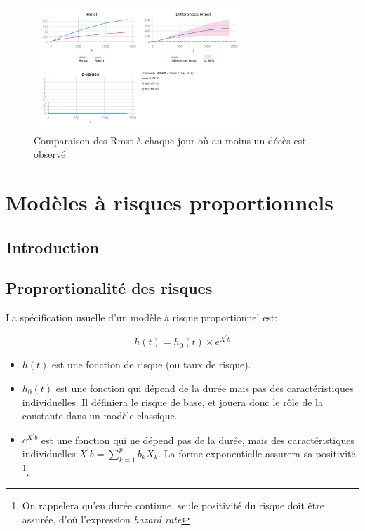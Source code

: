 \documentclass[
  12pt,
  letterpaper,
  DIV=11,
  numbers=noendperiod,
  onepage,
  openany]{scrreprt}
\begin{document}
\begin{figure}

\caption{Comparaison des Rmst à chaque jour où au moins un décès est
observé}

{\centering \includegraphics[width=0.7\textwidth,height=\textheight]{images/image9rmst.png}

}

\end{figure}

\part{Modèles à risques proportionnels}

\hypertarget{introduction-1}{%
\chapter{\texorpdfstring{\textbf{Introduction}}{Introduction}}\label{introduction-1}}

\hypertarget{proprortionalituxe9-des-risques}{%
\chapter{Proprortionalité des
risques}\label{proprortionalituxe9-des-risques}}

La spécification usuelle d'un modèle à risque proportionnel est:

\[h(t)=h_0(t)\times e^{X^{'}b}\]

\begin{itemize}
\item
  \(h(t)\) est une fonction de risque (ou taux de risque).
\item
  \(h_0(t)\) est une fonction qui dépend de la durée mais pas des
  caractéristiques individuelles. Il définiera le risque de base, et
  jouera donc le rôle de la constante dans un modèle classique.
\item
  \(e^{X^{'}b}\) est une fonction qui ne dépend pas de la durée, mais
  des caractéristiques individuelles \(X^{'}b=\sum_{k=1}^{p}b_kX_k\). La
  forme exponentielle assurera sa positivité \footnote{On rappelera
    qu'en durée continue, seule positivité du risque doit être assurée,
    d'où l'expression \emph{hazard rate}}.
\end{itemize}
\end{document}
